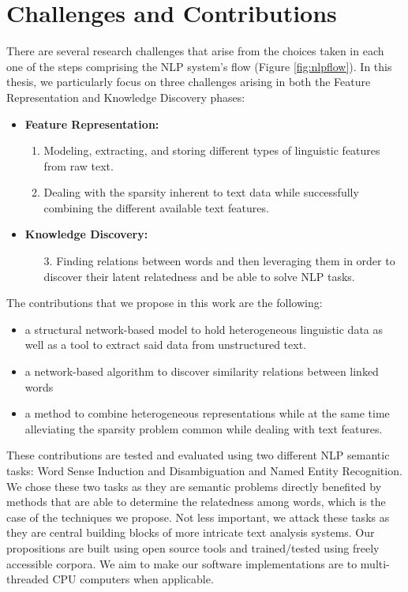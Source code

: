 \section{Challenges and Contributions}
There are several research challenges that arise from the choices taken in each one of the steps comprising the NLP system's flow (Figure \ref{fig:nlpflow}).
 In this thesis, we particularly focus on three challenges arising in both the Feature Representation and Knowledge Discovery phases:
\begin{itemize}
 \item \textbf{Feature Representation:}
	 \begin{enumerate}
	 \item  Modeling, extracting, and storing different types of linguistic features from raw text. 
	 \item Dealing with the sparsity inherent to text data while successfully combining the different available text features.
	
	 \end{enumerate}
 \item \textbf{Knowledge Discovery:}
 	\begin{enumerate}
 	\item[3.] Finding relations  between words and then leveraging them in order to discover their latent relatedness and be able to solve NLP tasks.
  	\end{enumerate}
\end{itemize}


The contributions that we propose in this work are the following:
\begin{itemize}
\item a structural network-based model to hold heterogeneous linguistic data as well as a tool to extract said data from unstructured text.
\item a network-based algorithm to discover similarity relations between linked words
\item a method to combine heterogeneous representations while at the same time alleviating the sparsity problem common while dealing with text features.
\end{itemize}
These contributions are tested and evaluated using two different NLP semantic tasks: Word Sense Induction and Disambiguation and Named Entity Recognition. We chose these two tasks as they are semantic problems directly benefited by methods  that are able to determine the relatedness among words, which is the case of the techniques we propose. Not less important, we attack these tasks as they are central building blocks of more intricate text analysis systems. Our propositions are built using open source tools and trained/tested using freely accessible corpora. We aim to make our software implementations are  to multi-threaded CPU computers when applicable.



